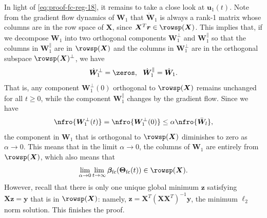 \documentclass{article} %
\def\vr{{\bm{r}}}
\def\vu{{\bm{u}}}
\def\vy{{\bm{y}}}
\def\vz{{\bm{z}}}
\def\mW{{\bm{W}}}
\def\mX{{\bm{X}}}
\newcommand{\vbeta}{{\bm{\beta}}}
\newcommand{\vbetafc}{\vbeta_{\rm fc}}
\newcommand{\bTheta}{\bm{\Theta}}
\newcommand{\bThetafc}{\bTheta_{\rm fc}}
\begin{document}
In light of \eqref{eq:proof-fc-reg-18}, it remains to take a close look at $\vu_1(t)$.
Note from the gradient flow dynamics of $\mW_1$ that $\dot \mW_1$ is always a rank-1 matrix whose columns are in the row space of $\mX$, since $\mX ^T \vr \in \rowsp(\mX)$. This implies that, if we decompose $\mW_1$ into two orthogonal components $\mW_1^\perp$ and $\mW_1^\parallel$ so that the columns in $\mW_1^\parallel$ are in $\rowsp(\mX)$ and the columns in $\mW_1^\perp$ are in the orthogonal subspace $\rowsp(\mX)^\perp$, we have
\begin{equation*}
    \dot \mW_1^\perp = \zeros,~~
    \dot \mW_1^\parallel = \dot \mW_1.
\end{equation*}
That is, any component $\mW_1^\perp(0)$ orthogonal to $\rowsp(\mX)$ remains unchanged for all $t \geq 0$, while the component $\mW_1^\parallel$ changes by the gradient flow.
Since we have 
\begin{equation*}
    \nfro{\mW_1^\perp(t)} = \nfro{\mW_1^\perp(0)} \leq \alpha \nfro{\bar \mW_l},
\end{equation*} 
the component in $\mW_1$ that is orthogonal to $\rowsp(\mX)$ diminishes to zero as $\alpha \to 0$. This means that in the limit $\alpha \to 0$, the columns of $\mW_1$ are entirely from $\rowsp(\mX)$, which also means that
\begin{equation*}
    \lim_{\alpha \to 0} \lim_{t \to \infty} \vbetafc(\bThetafc(t)) \in \rowsp(\mX).
\end{equation*}
However, recall that there is only one unique global minimum $\vz$ satisfying $\mX \vz = \vy$ that is in $\rowsp(\mX)$: namely, $\vz = \mX^T(\mX \mX^T)^{-1} \vy$, the minimum $\ell_2$ norm solution. This finishes the proof.
\end{document}
